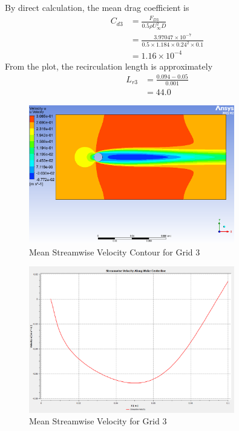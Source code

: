 By direct calculation, the mean drag coefficient is
\begin{align*}
    C_{d3} &= \frac{F_{D3}}{0.5\rho U_\infty^2 D} \\
    &= \frac{3.97047 \times 10^{-7}}{0.5 \times 1.184 \times 0.24^2 \times 0.1} \\
    &= 1.16 \times 10^{-4}
\end{align*}
From the plot, the recirculation length is approximately
\begin{align*}
    L_{r3} &= \frac{0.094 - 0.05}{0.001} \\
    &=\boxed{44.0}
\end{align*}
\begin{figure}[H]
    \centering
    \includegraphics[width=0.8\textwidth]{Questions/Figures/u velocity contour grid 3.png}
    \caption{Mean Streamwise Velocity Contour for Grid 3}
\end{figure}
\begin{figure}[H]
    \centering
    \includegraphics[width=0.8\textwidth]{Questions/Figures/plot with grid 3.png}
    \caption{Mean Streamwise Velocity for Grid 3}
\end{figure}
